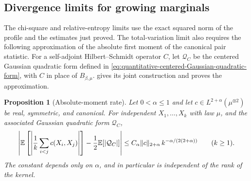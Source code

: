 \documentclass[11pt,reqno]{amsart}
\numberwithin{equation}{section}
\theoremstyle{plain}
\newtheorem{prop}[prop]{Proposition}
\theoremstyle{remark}
\DeclarePairedDelimiter{\abs}{\lvert}{\rvert}
\DeclarePairedDelimiter{\norm}{\lVert}{\rVert}
\newcommand{\E}{{\mathbb{E}}}
\newcommand{\be}{\beta}
\begin{document}
\subsection{Divergence limits for growing marginals}
\label{subsec:growing-divergence-proof}

The chi-square and relative-entropy limits use the exact squared norm of the profile and the estimates just proved.  The total-variation limit also requires the following approximation of the absolute first moment of the canonical pair statistic.  For a self-adjoint Hilbert--Schmidt operator $C$, let $\mathcal Q_C$ be the centered Gaussian quadratic form defined in \eqref{eq:quantitative-centered-Gaussian-quadratic-form}, with $C$ in place of $B_{\be,\mu}$.   gives its joint construction and proves the approximation.

\begin{prop}[Absolute-moment rate]\label{quant-tools:prop-absolute}
Let $0<\alpha\leq1$ and let $c\in L^{2+\alpha}(\mu^{\otimes2})$ be real, symmetric, and canonical. For independent $X_1,\ldots,X_k$ with law $\mu$, and the associated Gaussian quadratic form $\mathcal Q_C$,
\begin{equation}\label{quant-tools:eq-absolute}
 \left|\E\left[\left|\frac1k\sum_{i<j}c(X_i,X_j)\right|\right]
 -\frac12\E[\abs{\mathcal Q_C}]\right|
 \leq C_\alpha\norm c_{2+\alpha}\,k^{-\alpha/(2(2+\alpha))}
 \qquad(k\geq1).
\end{equation}
The constant depends only on $\alpha$, and in particular is independent of the rank of the kernel.
\end{prop}
\end{document}
